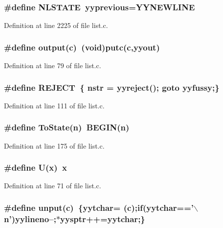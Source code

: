\subsubsection{\setlength{\rightskip}{0pt plus 5cm}\#define NLSTATE~\bf{yyprevious}=YYNEWLINE}\label{list_8c_0a3c2dd7ec2541ed7035842c0e5cb7b1}




Definition at line 2225 of file list.c.
\subsubsection{\setlength{\rightskip}{0pt plus 5cm}\#define output(c)~(void)putc(c,\bf{yyout})}\label{list_8c_1a757ed386b9ccb6fb369a7cdbeca52f}




Definition at line 79 of file list.c.
\subsubsection{\setlength{\rightskip}{0pt plus 5cm}\#define REJECT~\{ nstr = yyreject(); goto yyfussy;\}}\label{list_8c_835f10dd1ab4bf9a80c4cd80ee6e3058}




Definition at line 111 of file list.c.
\subsubsection{\setlength{\rightskip}{0pt plus 5cm}\#define To\-State(n)~BEGIN(n)}\label{list_8c_e4f339f05d10a7ba069f63a0d82ba7d4}




Definition at line 175 of file list.c.
\subsubsection{\setlength{\rightskip}{0pt plus 5cm}\#define U(x)~x}\label{list_8c_2e9a0e2ee6ec47b10497aa3fa424707a}




Definition at line 71 of file list.c.
\subsubsection{\setlength{\rightskip}{0pt plus 5cm}\#define unput(c)~\{\bf{yytchar}= (c);if(\bf{yytchar}=='$\backslash$n')\bf{yylineno}--;$\ast$\bf{yysptr}++=\bf{yytchar};\}}\label{list_8c_448a4e9041a09588332733c6846c770c}




